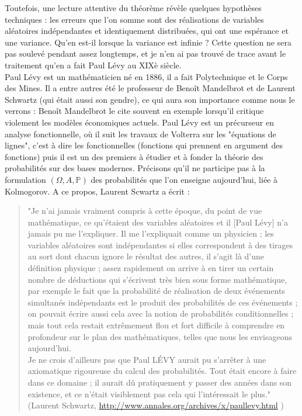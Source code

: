 \documentclass{article}
\begin{document}
Toutefois, une lecture attentive du théorème révèle quelques hypothèses techniques : les erreurs que l'on somme sont des réalisations de variables aléatoires indépendantes et identiquement distribuées, qui ont une espérance et une variance. Qu'en est-il lorsque la variance est infinie ? Cette question ne sera pas soulevé pendant assez longtemps, et je n'en ai pas trouvé de trace avant le traitement qu'en a fait Paul Lévy au XIXè siècle.\\

Paul Lévy est un mathématicien né en 1886, il a fait Polytechnique et le Corps des Mines. Il a entre autres %
été le professeur de Benoît Mandelbrot et de Laurent Schwartz (qui était aussi son gendre), ce qui aura son importance comme nous le verrons : Benoît Mandelbrot le cite souvent en exemple lorsqu'il critique violement les modèles économiques actuels. Paul Lévy est un précurseur en analyse fonctionnelle, où il suit les travaux de Volterra sur les "équations de lignes", c'est à dire les fonctionnelles (fonctions qui prennent en argument des fonctions) puis il est un des premiers à étudier et à fonder la théorie des probabilités sur des bases modernes. Précisons qu'il ne participe pas à la formulation $(\Omega,A,\mathbb P)$ des probabilités que l'on enseigne aujourd'hui, liée à Kolmogorov. A ce propos, Laurent Scwartz a écrit :

\begin{quotation}
"Je n'ai jamais vraiment compris à cette époque, du point de vue mathématique, ce qu'étaient des variables aléatoires et il [Paul Lévy] n'a jamais pu me l'expliquer. Il me l'expliquait comme un physicien ; les variables aléatoires sont indépendantes si elles correspondent à des tirages au sort dont chacun ignore le résultat des autres, il s'agit là d'une définition physique ; assez rapidement on arrive à en tirer un certain nombre de déductions qui s'écrivent très bien sous forme mathématique, par exemple le fait que la probabilité de réalisation de deux événements simultanés indépendants est le produit des probabilités de ces événements ; on pouvait écrire aussi cela avec la notion de probabilités conditionnelles ; mais tout cela restait extrêmement flou et fort difficile à comprendre en profondeur sur le plan des mathématiques, telles que nous les envisageons aujourd'hui.\\
Je ne crois d'ailleurs pas que Paul LÉVY aurait pu s'arrêter à une axiomatique rigoureuse du calcul des probabilités. Tout était encore à faire dans ce domaine ; il aurait dû pratiquement y passer des années dans son existence, et ce n'était visiblement pas cela qui l'intéressait le plus." (Laurent Schwartz, \url{ http://www.annales.org/archives/x/paullevy.html} )
\end{quotation}
\end{document}
